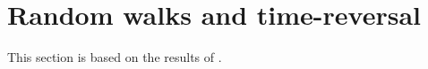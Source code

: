 \section{Random walks and time-reversal}
\label{sec:random-walks-time}

This section is based on the results of \cite{jorgensen1975central}.

